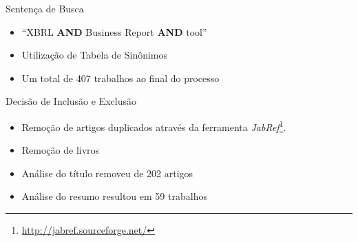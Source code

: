 \documentclass[t,14pt,mathserif]{beamer}
\begin{document}
\begin{frame}{Sentença de Busca}
\begin{itemize}
    \item ``XBRL \textbf{AND} Business Report \textbf{AND} tool''
    \item Utilização de Tabela de Sinônimos
    \item Um total de 407 trabalhos ao final do processo

\end{itemize}
\begin{table}[ht]
\centering
{}
\caption{Dicionário de Sinônimos}
\label{tab:dicionario}
\end{table}

\end{frame}

\begin{frame}{Decisão de Inclusão e Exclusão}
    \begin{itemize}
      \item Remoção de artigos duplicados através da ferramenta
        \textit{JabRef}\footnote{\url{http://jabref.sourceforge.net/}}.
      \item Remoção de livros
      \item Análise do título removeu de 202 artigos
      \item Análise do resumo resultou em 59 trabalhos
    \end{itemize}
\end{frame}
\end{document}
